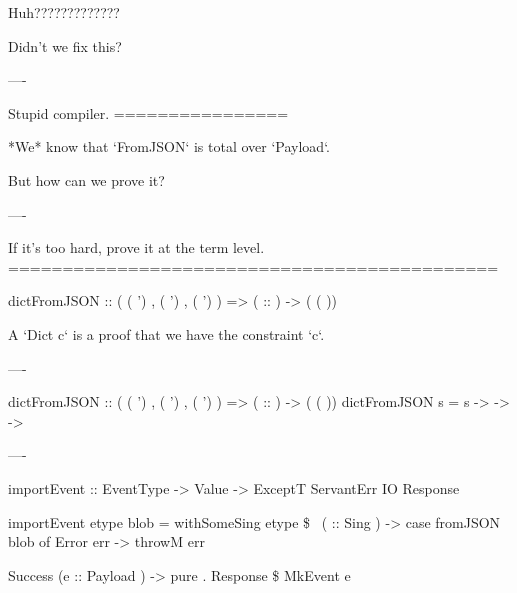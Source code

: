 Huh?????????????

Didn't we fix this?

----

Stupid compiler.
================

*We* know that `FromJSON` is total over `Payload`.

But how can we prove it?

----

If it's too hard, prove it at the term level.
=============================================

\begin{custom}
  dictFromJSON :: (  ( ')
                  ,  ( ')
                  ,  ( ')
                  )
               =>  ( :: )
               ->  ( ( ))
\end{custom}

A `Dict c` is a proof that we have the constraint `c`.

----

\begin{custom}
  dictFromJSON :: (  ( ')
                  ,  ( ')
                  ,  ( ')
                  )
               =>  ( :: )
               ->  ( ( ))
  dictFromJSON s =  s 
      -> 
         -> 
     -> 
\end{custom}

----

\begin{raw}
  importEvent :: EventType
              -> Value
              -> ExceptT ServantErr IO Response

  importEvent etype blob =
    withSomeSing etype \$ \ ( :: Sing ) ->
          case fromJSON blob of
            Error err ->
              throwM err

            Success (e :: Payload ) ->
              pure . Response \$ MkEvent e
\end{raw}

